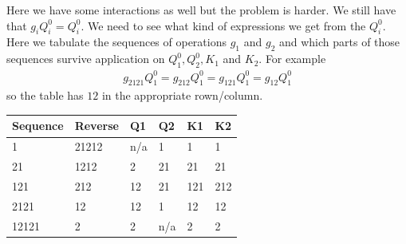 Here we have some interactions as well but the problem is harder. We still have that $g_i Q_i^0 = Q_i^0$. We need to see what kind of expressions we get from the $Q_i^0$. Here we tabulate the sequences of operations $g_1$ and $g_2$ and which parts of those sequences survive application on $Q_1^0,Q_2^0, K_1$ and $K_2$. For example
\begin{align}
g_{2121}Q_1^0 = g_{212}Q_1^0 = g_{121} Q_1^0 = g_{12}Q_1^0
\end{align}
so the table has $12$ in the appropriate rown/column.

\begin{center}
    \begin{tabular}{| l | l | l | l | l | l |}
    \hline
    Sequence & Reverse & Q1 & Q2 & K1 & K2 \\ \hline
    1 & 21212 & n/a & 1& 1& 1 \\ \hline
    21 &  1212& 2& 21 & 21& 21  \\ \hline
    121 & 212 & 12& 21& 121& 212 \\ \hline
    2121 & 12 &  12 & 1 & 12 & 12 \\ \hline
    12121 & 2 &  2& n/a& 2& 2 \\
    \hline
    \end{tabular}
\end{center}

